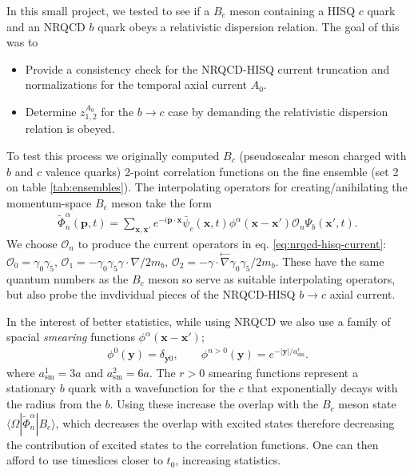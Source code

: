 In this small project, we tested to see if a $B_c$ meson containing a HISQ $c$ quark and an NRQCD $b$ quark obeys a relativistic dispersion relation. The goal of this was to
\begin{itemize}
\item
  Provide a consistency check for the NRQCD-HISQ current truncation and normalizations for the temporal axial current $A_0$.
\item
  Determine $z^{A_0}_{1,2}$ for the $b\to c$ case by demanding the relativistic dispersion relation is obeyed.
\end{itemize}
To test this process we originally computed $B_c$ (pseudoscalar meson charged with $b$ and $c$ valence quarks) 2-point correlation functions on the fine ensemble (set 2 on table \ref{tab:ensembles}). The interpolating operators for creating/anihilating the momentum-space $B_c$ meson take the form
\begin{align}
  \tilde{\Phi}_n^{\alpha}(\textbf{p},t) = \sum_{\textbf{x},\textbf{x}'} e^{-i\textbf{p}\cdot\textbf{x}} \bar{\psi}_c(\textbf{x},t) \phi^{\alpha}(\textbf{x}-\textbf{x}')\mathcal{O}_n \Psi_b(\textbf{x}',t).
\end{align}
We choose $\mathcal{O}_n$ to produce the current operators in eq. \eqref{eq:nrqcd-hisq-current}: $\mathcal{O}_0 = \gamma_0\gamma_5$, $\mathcal{O}_1 = -\gamma_0\gamma_5 \gamma\cdot \nabla /2m_b$, $\mathcal{O}_2 = - \gamma\cdot \stackrel{\leftarrow}{\nabla} \gamma_0\gamma_5  /2m_b$. These have the same quantum numbers as the $B_c$ meson so serve as suitable interpolating operators, but also probe the invdividual pieces of the NRQCD-HISQ $b\to c$ axial current.

In the interest of better statistics, while using NRQCD we also use a family of spacial {\it{smearing}} functions $\phi^{\alpha}({\textbf{x}}-{\textbf{x}}')$;
\begin{align}
  \phi^0({\textbf{y}}) = \delta_{\textbf{y}0},\quad\quad
  \phi^{n>0}({\textbf{y}}) = e^{-|{\textbf{y}}|/a^r_{\text{sm}}}.
  \label{eq:smearings}
\end{align}
where $a^1_{\text{sm}} = 3a$ and $a^2_{\text{sm}} = 6a$. The $r>0$ smearing functions represent a stationary $b$ quark with a wavefunction for the $c$ that exponentially decays with the radius from the $b$. Using these increase the overlap with the $B_c$ meson state $\langle \Omega | \tilde{\Phi}_n^{\alpha}|B_c\rangle$, which decreases the overlap with excited states therefore decreasing the contribution of excited states to the correlation functions. One can then afford to use timeslices closer to $t_0$, increasing statistics.

